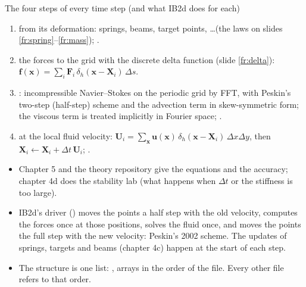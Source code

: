\documentclass[aspectratio=169,11pt]{beamer}
\begin{document}
\begin{frame}{The four steps of every time step (and what IB2d does for each)}
\label{fr:steps}
\footnotesize
\begin{enumerate}
  \item {} from its deformation: springs, beams, target points, \ldots (the laws on slides \ref{fr:spring}--\ref{fr:mass}); .
  \item {} the forces to the grid with the discrete delta function (slide \ref{fr:delta}): $\mathbf{f}(\mathbf{x}) = \sum_i \mathbf{F}_i\, \delta_h(\mathbf{x} - \mathbf{X}_i)\, \Delta s$.
  \item {}: incompressible Navier--Stokes on the periodic grid by FFT, with Peskin's two-step (half-step) scheme and the advection term in skew-symmetric form; the viscous term is treated implicitly in Fourier space; .
  \item {} at the local fluid velocity: $\mathbf{U}_i = \sum_{\mathbf{x}} \mathbf{u}(\mathbf{x})\, \delta_h(\mathbf{x} - \mathbf{X}_i)\, \Delta x \Delta y$, then $\mathbf{X}_i \leftarrow \mathbf{X}_i + \Delta t\, \mathbf{U}_i$; .
\end{enumerate}
\begin{itemize}
  \item Chapter 5 and the theory repository give the equations and the accuracy; chapter 4d does the stability lab (what happens when $\Delta t$ or the stiffness is too large).
  \item IB2d's driver () moves the points a half step with the old velocity, computes the forces once at those positions, solves the fluid once, and moves the points the full step with the new velocity: Peskin's 2002 scheme. The updates of springs, targets and beams (chapter 4c) happen at the start of each step.
  \item The structure is one list: ,  arrays in the order of the  file. Every other file refers to that order.
\end{itemize}
\end{frame}
\end{document}
